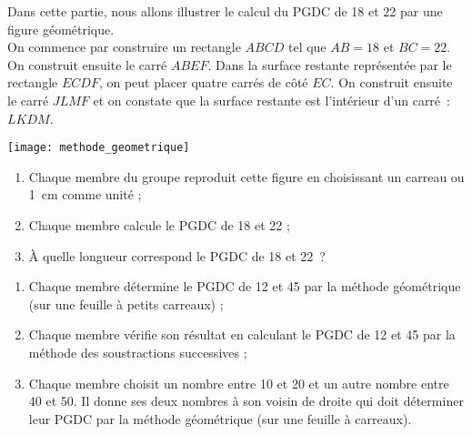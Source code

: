 
\begin{TP}

Dans cette partie, nous allons illustrer le calcul du PGDC de 18 et 22 par une figure géométrique.\\[0.5em]
On commence par construire un rectangle $ABCD$ tel que $AB = 18$ et $BC = 22$. On construit ensuite le carré $ABEF$. Dans la surface restante représentée par le rectangle $ECDF$, on peut placer quatre carrés de côté $EC$. On construit ensuite le carré $JLMF$ et on constate que la surface restante est l'intérieur d'un carré : \textcolor{C2}{$LKDM$}.
\begin{center} \texttt{[image: methode\_geometrique]} \end{center}

\begin{enumerate}
 \item Chaque membre du groupe reproduit cette figure en choisissant un carreau ou 1 cm comme unité ;
 \item Chaque membre calcule le PGDC de 18 et 22 ;
 \item À quelle longueur correspond le PGDC de 18 et 22 ?
 \end{enumerate}
 

\begin{enumerate}
 \item Chaque membre détermine le PGDC de 12 et 45 par la méthode géométrique (sur une feuille à petits carreaux) ;
 \item Chaque membre vérifie son résultat en calculant le PGDC de 12 et 45 par la méthode des soustractions successives ;
 \item Chaque membre choisit un nombre entre 10 et 20 et un autre nombre entre 40 et 50. Il donne ses deux nombres à son voisin de droite qui doit déterminer leur PGDC par la méthode géométrique (sur une feuille à carreaux).
 \end{enumerate}
 
\end{TP}


